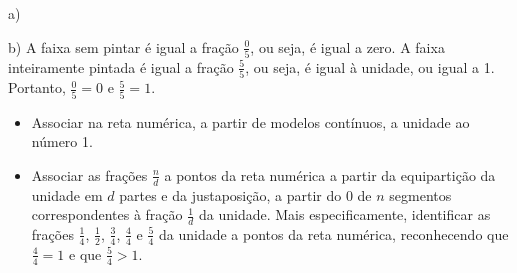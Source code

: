 \clearpage
\begin{multicols}{2}
\begin{solucao}{}{}

\noindent a)
\begin{center}
\end{center}

\noindent b)   A faixa sem pintar é igual a fração $\frac{0}{5}$, ou seja, é igual a zero. A faixa inteiramente pintada é igual a fração $\frac{5}{5}$, ou seja, é igual à unidade, ou igual a 1. Portanto, $\frac{0}{5}=0$ e $\frac{5}{5}=1$.
\end{solucao}


\begin{objetivos}[label=chap3-ativ6]{}{}
\begin{itemize} %
    \item       Associar na reta numérica, a partir de modelos contínuos, a unidade ao número 1.
    \item       Associar as frações $\frac{n}{d}$ a pontos da reta numérica a partir da equipartição da unidade em $d$ partes e da justaposição, a partir do  $0$ de $n$ segmentos correspondentes à fração $\frac{1}{d}$ da unidade. Mais especificamente, identificar as frações $\frac{1}{4}$, $\frac{1}{2}$, $\frac{3}{4}$, $\frac{4}{4}$ e $\frac{5}{4}$ da unidade a pontos da reta numérica, reconhecendo que $\frac{4}{4}=1$ e que $\frac{5}{4}>1$.
\end{itemize} %
\end{objetivos}


\end{multicols}
